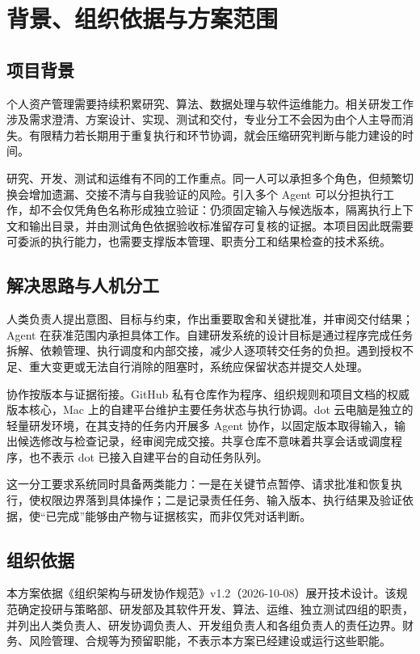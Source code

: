\documentclass[11pt,a4paper]{article}
\begin{document}
\section{背景、组织依据与方案范围}

\subsection{项目背景}

个人资产管理需要持续积累研究、算法、数据处理与软件运维能力。相关研发工作涉及需求澄清、方案设计、实现、测试和交付，专业分工不会因为由个人主导而消失。有限精力若长期用于重复执行和环节协调，就会压缩研究判断与能力建设的时间。

研究、开发、测试和运维有不同的工作重点。同一人可以承担多个角色，但频繁切换会增加遗漏、交接不清与自我验证的风险。引入多个 Agent 可以分担执行工作，却不会仅凭角色名称形成独立验证：仍须固定输入与候选版本，隔离执行上下文和输出目录，并由测试角色依据验收标准留存可复核的证据。本项目因此既需要可委派的执行能力，也需要支撑版本管理、职责分工和结果检查的技术系统。

\subsection{解决思路与人机分工}

人类负责人提出意图、目标与约束，作出重要取舍和关键批准，并审阅交付结果；Agent 在获准范围内承担具体工作。自建研发系统的设计目标是通过程序完成任务拆解、依赖管理、执行调度和内部交接，减少人逐项转交任务的负担。遇到授权不足、重大变更或无法自行消除的阻塞时，系统应保留状态并提交人处理。

协作按版本与证据衔接。GitHub 私有仓库作为程序、组织规则和项目文档的权威版本核心，Mac 上的自建平台维护主要任务状态与执行协调。dot 云电脑是独立的轻量研发环境，在其支持的任务内开展多 Agent 协作，以固定版本取得输入，输出候选修改与检查记录，经审阅完成交接。共享仓库不意味着共享会话或调度程序，也不表示 dot 已接入自建平台的自动任务队列。

这一分工要求系统同时具备两类能力：一是在关键节点暂停、请求批准和恢复执行，使权限边界落到具体操作；二是记录责任任务、输入版本、执行结果及验证依据，使“已完成”能够由产物与证据核实，而非仅凭对话判断。

\subsection{组织依据}

本方案依据《组织架构与研发协作规范》v1.2（2026-10-08）展开技术设计。该规范确定投研与策略部、研发部及其软件开发、算法、运维、独立测试四组的职责，并列出人类负责人、研发协调负责人、开发组负责人和各组负责人的责任边界。财务、风险管理、合规等为预留职能，不表示本方案已经建设或运行这些职能。
\end{document}
